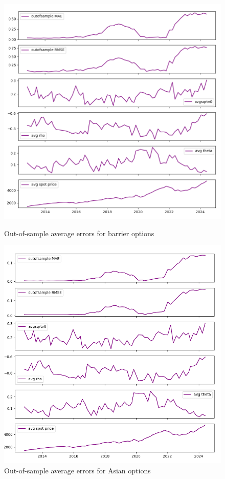 \documentclass[11pt]{article}
\begin{document}
		\begin{figure}[htbp]
			\centering
			\begin{minipage}{0.48\textwidth}
				\centering
				\includegraphics[width=\textwidth]{barrier errors.png}
				\caption{Out-of-sample average errors for barrier options}
				\label{fig:barrierErrors}
			\end{minipage}%
			\hfill
			\begin{minipage}{0.48\textwidth}
				\centering
				\includegraphics[width=\textwidth]{Asian errors.png}
				\caption{Out-of-sample average errors for Asian options}
				\label{fig:asianErrors}
			\end{minipage}
		\end{figure}%
		
\end{document}
